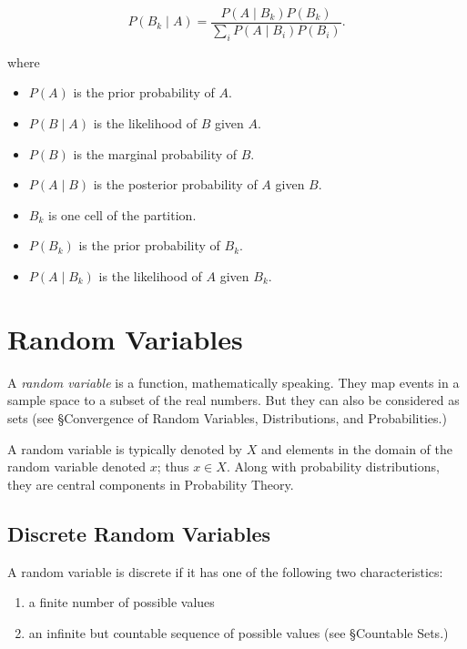 \documentclass{article}
\begin{document}
$$
P(B_k\mid A)=\frac{P(A\mid B_k)P(B_k)}{\sum_i P(A\mid B_i)P(B_i)}.
$$

where

\begin{itemize}
    \item $P(A)$ is the prior probability of $A$.
    \item $P(B\mid A)$ is the likelihood of $B$ given $A$.
    \item $P(B)$ is the marginal probability of $B$.
    \item $P(A\mid B)$ is the posterior probability of $A$ given $B$.
    \item $B_k$ is one cell of the partition.
    \item $P(B_k)$ is the prior probability of $B_k$.
    \item $P(A\mid B_k)$ is the likelihood of $A$ given $B_k$.
\end{itemize}

\newpage
\section{Random Variables}
A \emph{random variable} is a function, mathematically speaking. They map events in a sample space to a subset of the real numbers. But they can also be considered as sets (see §Convergence of Random Variables, Distributions, and Probabilities.) 

A random variable is typically denoted by $X$ and elements in the domain of the random variable denoted $x$; thus $x \in X$. Along with probability distributions, they are central components in Probability Theory.

\subsection{Discrete Random Variables}
A random variable is discrete if it has one of the following two characteristics:
 
\begin{enumerate}
    \item a finite number of possible values
    \item an infinite but countable sequence of possible values (see §Countable Sets.)
\end{enumerate}

\end{document}
